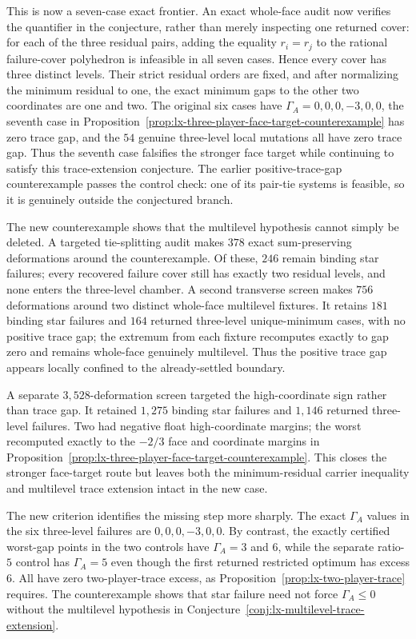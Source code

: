 This is now a seven-case exact frontier.  An exact whole-face audit
now verifies the quantifier in the conjecture, rather than merely inspecting
one returned cover: for each of the three residual pairs, adding the equality
$r_i=r_j$ to the rational failure-cover polyhedron is infeasible in all seven
cases.  Hence every cover has three distinct levels.  Their strict residual
orders are fixed, and after normalizing the minimum residual to one, the exact
minimum gaps to the other two coordinates are one and two.  The original six
cases have $\Gamma_A=0,0,0,-3,0,0$, the seventh case in
Proposition~\ref{prop:lx-three-player-face-target-counterexample} has zero
trace gap, and the $54$ genuine three-level local mutations all have zero
trace gap.  Thus the seventh case falsifies the stronger face target while
continuing to satisfy this trace-extension conjecture.  The earlier
positive-trace-gap counterexample passes the control check: one of its pair-tie
systems is feasible, so it is genuinely outside the conjectured branch.

The new counterexample shows that the multilevel hypothesis cannot simply be
deleted.  A targeted
tie-splitting audit makes $378$ exact sum-preserving deformations around the
counterexample.  Of these, $246$ remain binding star failures; every recovered
failure cover still has exactly two residual levels, and none enters the
three-level chamber.  A second transverse screen makes $756$ deformations
around two distinct whole-face multilevel fixtures.  It retains $181$ binding
star failures and $164$ returned three-level unique-minimum cases, with no
positive trace gap; the extremum from each fixture recomputes exactly to gap
zero and remains whole-face genuinely multilevel.  Thus the positive trace gap
appears locally confined to the already-settled boundary.

A separate $3{,}528$-deformation screen targeted the high-coordinate sign
rather than trace gap.  It retained $1{,}275$ binding star failures and
$1{,}146$ returned three-level failures.  Two had negative float
high-coordinate margins; the worst recomputed exactly to the $-2/3$ face and
coordinate margins in
Proposition~\ref{prop:lx-three-player-face-target-counterexample}.  This closes
the stronger face-target route but leaves both the minimum-residual carrier
inequality and multilevel trace extension intact in the new case.

The new criterion identifies the missing step more sharply.  The exact
$\Gamma_A$ values in the six three-level failures are
$0,0,0,-3,0,0$.  By contrast, the exactly certified worst-gap points in the two
controls have $\Gamma_A=3$ and $6$, while the separate ratio-$5$ control has
$\Gamma_A=5$ even though the first returned restricted optimum has excess
$6$.  All have zero two-player-trace excess, as
Proposition~\ref{prop:lx-two-player-trace} requires.  The counterexample shows
that star failure need not force $\Gamma_A\leq0$ without the multilevel
hypothesis in Conjecture~\ref{conj:lx-multilevel-trace-extension}.

